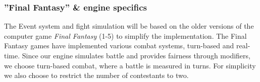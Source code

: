 \subsubsection*{''Final Fantasy'' \& engine specifics}
The Event system and fight simulation will be based on the older versions of the computer game \emph{Final Fantasy} (1-5) to simplify the implementation.
The Final Fantasy games have implemented various combat systems, turn-based and real-time.\cite{ffantasy}
Since our engine simulates battle and provides fairness through modifiers, we choose turn-based combat, where a battle is measured in turns.
For simplicity we also choose to restrict the number of contestants to two.



